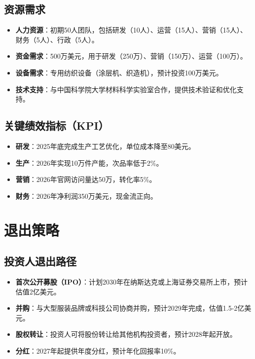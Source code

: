 \documentclass[UTF8]{report}
\theoremstyle{MyLineTheoremStyle} %
\theoremstyle{MyBlockTheoremStyle} %
\theoremstyle{MySubsubsectionStyle} %
\begin{document}
\section{资源需求}
\begin{itemize}
    \item \textbf{人力资源}：初期50人团队，包括研发（10人）、运营（15人）、营销（15人）、财务（5人）、行政（5人）。
    \item \textbf{资金需求}：500万美元，用于研发（250万）、营销（150万）、运营（100万）。
    \item \textbf{设备需求}：专用纺织设备（涂层机、织造机），预计投资100万美元。
    \item \textbf{技术支持}：与中国科学院大学材料科学实验室合作，提供技术验证和优化支持。
\end{itemize}

\section{关键绩效指标（KPI）}
\begin{itemize}
    \item \textbf{研发}：2025年底完成生产工艺优化，单位成本降至80美元。
    \item \textbf{生产}：2026年实现10万件产能，次品率低于2\%。
    \item \textbf{营销}：2026年官网访问量达50万，转化率5\%。
    \item \textbf{财务}：2026年净利润350万美元，现金流正向。
\end{itemize}

\chapter{退出策略}
\section{投资人退出路径}
\begin{itemize}
    \item \textbf{首次公开募股（IPO）}：计划2030年在纳斯达克或上海证券交易所上市，预计估值2亿美元。
    \item \textbf{并购}：与大型服装品牌或科技公司协商并购，预计2029年完成，估值1.5-2亿美元。
    \item \textbf{股权转让}：投资人可将股份转让给其他机构投资者，预计2028年起开放。
    \item \textbf{分红}：2027年起提供年度分红，预计年化回报率10\%。
\end{itemize}
\end{document}
